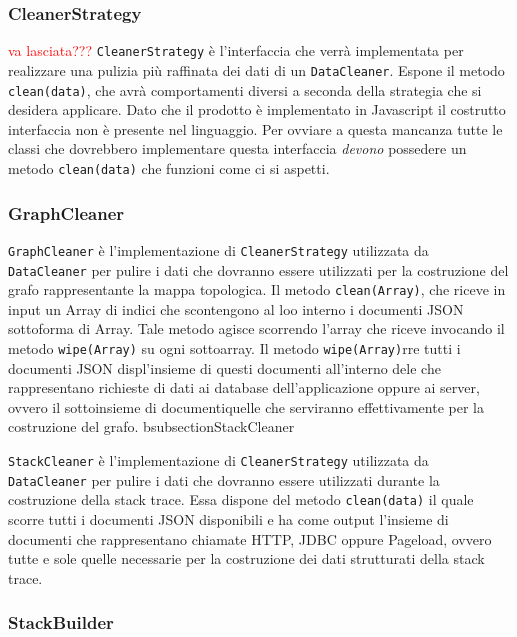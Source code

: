 	
\subsubsection{CleanerStrategy}
\label{sec:CleanerStrategy}
\textcolor{red}{va lasciata???}
\texttt{CleanerStrategy} è l'interfaccia che verrà implementata per realizzare una pulizia più raffinata dei dati di un \texttt{DataCleaner}. Espone il metodo \texttt{clean(data)}, che avrà comportamenti diversi a seconda della strategia che si desidera applicare. Dato che il prodotto è implementato in Javascript il costrutto interfaccia non è presente nel linguaggio. Per ovviare a questa mancanza tutte le classi che dovrebbero implementare questa interfaccia \emph{devono} possedere un metodo \texttt{clean(data)} che funzioni come ci si aspetti. 

	
	
\subsubsection{GraphCleaner}
\label{sec:GraphCleaner}

\texttt{GraphCleaner} è l'implementazione di \texttt{CleanerStrategy} utilizzata da \texttt{DataCleaner} per pulire i dati che dovranno essere utilizzati per la costruzione del grafo rappresentante la mappa topologica. Il metodo \texttt{clean(Array)}, che riceve in input un Array di indici che scontengono al loo interno i documenti JSON sottoforma di Array. Tale metodo agisce scorrendo l'array che riceve invocando il metodo \texttt{wipe(Array)} su ogni sottoarray. Il metodo \texttt{wipe(Array)}rre tutti i documenti JSON displ'insieme di questi documenti all'interno dele che rappresentano richieste di dati ai database dell'applicazione oppure ai server, ovvero il sottoinsieme di documentiquelle che serviranno effettivamente per la costruzione del grafo.      bsubsection{StackCleaner}
\label{sec:StackCleaner}

\texttt{StackCleaner} è l'implementazione di \texttt{CleanerStrategy} utilizzata da \texttt{DataCleaner} per pulire i dati che dovranno essere utilizzati durante la costruzione della stack trace. Essa dispone del metodo \texttt{clean(data)} il quale scorre tutti i documenti JSON disponibili e ha come output l'insieme di documenti che rappresentano chiamate HTTP, JDBC oppure Pageload, ovvero tutte e sole quelle necessarie per la costruzione dei dati strutturati della stack trace.



\subsubsection{StackBuilder}
\label{sec:StackBuilder}

